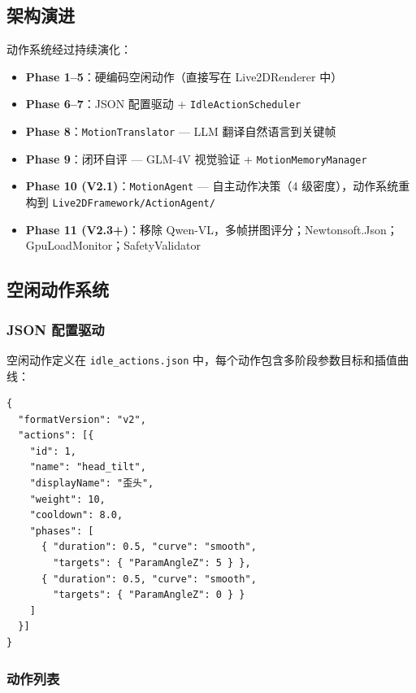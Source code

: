 \documentclass[12pt,a4paper]{ctexart}
\begin{document}
\subsection{架构演进}

动作系统经过持续演化：

\begin{itemize}
    \item \textbf{Phase 1--5}：硬编码空闲动作（直接写在 Live2DRenderer 中）
    \item \textbf{Phase 6--7}：JSON 配置驱动 + \texttt{IdleActionScheduler}
    \item \textbf{Phase 8}：\texttt{MotionTranslator} --- LLM 翻译自然语言到关键帧
    \item \textbf{Phase 9}：闭环自评 --- GLM-4V 视觉验证 + \texttt{MotionMemoryManager}
    \item \textbf{Phase 10 (V2.1)}：\texttt{MotionAgent} --- 自主动作决策（4 级密度），动作系统重构到 \texttt{Live2DFramework/ActionAgent/}
    \item \textbf{Phase 11 (V2.3+)}：移除 Qwen-VL，多帧拼图评分；Newtonsoft.Json；GpuLoadMonitor；SafetyValidator
\end{itemize}

\subsection{空闲动作系统}

\subsubsection{JSON 配置驱动}

空闲动作定义在 \texttt{idle\_actions.json} 中，每个动作包含多阶段参数目标和插值曲线：

\begin{lstlisting}[style=json,caption={空闲动作 JSON 配置},label={lst:idle-json}]
{
  "formatVersion": "v2",
  "actions": [{
    "id": 1,
    "name": "head_tilt",
    "displayName": "歪头",
    "weight": 10,
    "cooldown": 8.0,
    "phases": [
      { "duration": 0.5, "curve": "smooth",
        "targets": { "ParamAngleZ": 5 } },
      { "duration": 0.5, "curve": "smooth",
        "targets": { "ParamAngleZ": 0 } }
    ]
  }]
}
\end{lstlisting}

\subsubsection{动作列表}
\end{document}
